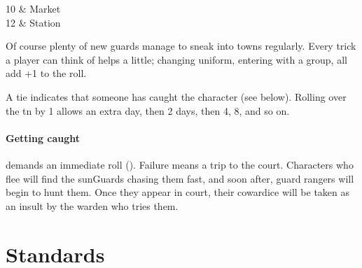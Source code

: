 \begin{multicols}{2}
{\begin{boxtable}[cY]
    10 & Market \\

    12 &  Station \\

  \end{boxtable}
}

Of course plenty of new \glspl{guard} manage to sneak into towns regularly.
Every trick a player can think of helps a little; changing uniform, entering with a group, all add +1 to the roll.

A tie indicates that someone has caught the character (see below).
Rolling over the \gls{tn} by 1 allows an extra day, then 2 days, then 4, 8, and so on.

\paragraph{Getting caught}
demands an immediate  roll (\tn[10]).
Failure means a trip to the \gls{court}.
Characters who flee will find the \glspl{sunGuard} chasing them fast, and soon after, \gls{guard} \glspl{ranger} will begin to hunt them.
Once they appear in \gls{court}, their cowardice will be taken as an insult by the \gls{warden} who tries them.%

\end{multicols}


\section{Standards}

